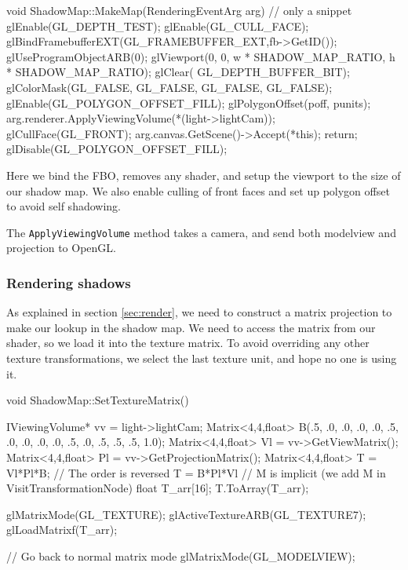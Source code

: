 \begin{cppcode}
void ShadowMap::MakeMap(RenderingEventArg arg) {
     // only a snippet
    glEnable(GL_DEPTH_TEST);
    glEnable(GL_CULL_FACE);
    glBindFramebufferEXT(GL_FRAMEBUFFER_EXT,fb->GetID());
    glUseProgramObjectARB(0);
    glViewport(0, 0,
               w * SHADOW_MAP_RATIO,
               h * SHADOW_MAP_RATIO);
    glClear( GL_DEPTH_BUFFER_BIT);
    glColorMask(GL_FALSE, GL_FALSE, GL_FALSE, GL_FALSE); 
    glEnable(GL_POLYGON_OFFSET_FILL);
    glPolygonOffset(poff, punits);
    arg.renderer.ApplyViewingVolume(*(light->lightCam));
    glCullFace(GL_FRONT);
    arg.canvas.GetScene()->Accept(*this); return;
    glDisable(GL_POLYGON_OFFSET_FILL);
}
\end{cppcode}

Here we bind the FBO, removes any shader, and setup the viewport to
the size of our shadow map. We also enable culling of front faces and
set up polygon offset to avoid self shadowing.

The \texttt{ApplyViewingVolume} method takes a camera, and send both
modelview and projection to OpenGL.


\subsubsection*{Rendering shadows}

As explained in section \ref{sec:render}, we need to construct a
matrix projection to make our lookup in the shadow map. We need to
access the matrix from our shader, so we load it into the texture
matrix. To avoid overriding any other texture transformations, we
select the last texture unit, and hope no one is using it.

\begin{cppcode}
  void ShadowMap::SetTextureMatrix() {    
    IViewingVolume* vv = light->lightCam;
    Matrix<4,4,float> B(.5, .0, .0,  .0,
                        .0, .5, .0,  .0,
                        .0, .0, .5,  .0,
                        .5, .5, .5, 1.0);
    Matrix<4,4,float> Vl = vv->GetViewMatrix();
    Matrix<4,4,float> Pl = vv->GetProjectionMatrix();    
    Matrix<4,4,float> T = Vl*Pl*B; // The order is reversed T = B*Pl*Vl 
                                   // M is implicit (we add M in VisitTransformationNode)
    float T_arr[16];
    T.ToArray(T_arr);

    glMatrixMode(GL_TEXTURE);
    glActiveTextureARB(GL_TEXTURE7);
    glLoadMatrixf(T_arr);

    // Go back to normal matrix mode
    glMatrixMode(GL_MODELVIEW);
}
\end{cppcode}

